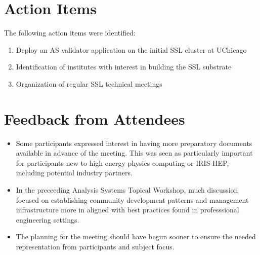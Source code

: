 \documentclass[11pt,letterpaper,fleqn]{article}
\begin{document}


\section{Action Items}
The following action items were identified:
\begin{enumerate}
  \item Deploy an AS validator application on the initial SSL cluster at UChicago
  \item Identification of institutes with interest in building the SSL substrate
  \item Organization of regular SSL technical meetings
\end{enumerate}

\section{Feedback from Attendees}
\begin{itemize}
  \item Some participants expressed interest in having more preparatory documents available in advance of the meeting.  This was seen as particularly important for participants new to high energy physics computing or IRIS-HEP, including potential industry partners.
  \item In the preceeding Analysis Systems Topical Workshop, much discussion focused on establishing community development patterns and management infrastructure more in aligned with best practices found in professsional engineering settings.
  \item The planning for the meeting should have begun sooner to ensure the needed representation from participants and subject focus.
\end{itemize}
\end{document}
